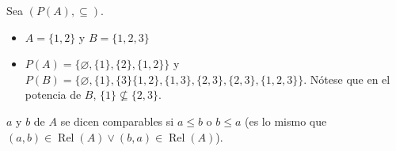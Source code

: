 \begin{ejemplo}
    Sea $(P(A), \subseteq)$. 
    \begin{itemize}
        \item $A=\{1,2\}$ y $B=\{1,2,3\}$
        \item $P(A)=\{\varnothing,\{1\},\{2\},\{1,2\}\}$ y $P(B)=\{\varnothing, \{1\},\{3\}\{1,2\},\{1,3\},\{2,3\},\{2,3\},\{1,2,3\}\}$. Nótese que en el potencia de $B$, $\{1\}\not\subseteq \{2,3\}$.
    \end{itemize}
\end{ejemplo}

\begin{nota}
    $a$ y $b$ de $A$ se dicen comparables si $a\leq b$ o $b\leq a$ (es lo mismo que $(a,b)\in\operatorname{Rel}(A)\vee (b,a)\in\operatorname{Rel}(A)$).
\end{nota}